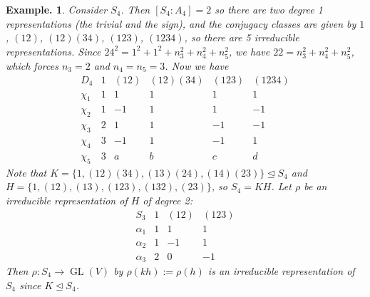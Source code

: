 \documentclass[11pt, a4paper]{memoir}
\theoremstyle{change}
\theoremstyle{plain}
\theoremstyle{nonumberplain}
\newtheorem{example}{Example.}
\DeclareMathOperator{\GL}{GL}
\numberwithin{equation}{section}
\begin{document}
\begin{example}
    Consider $S_4$.
    Then $[S_4:A_4]=2$ so there are two degree 1 representations (the trivial and the sign), and the conjugacy classes are given by $1$, $(12)$, $(12)(34)$, $(123)$, $(1234)$, so there are 5 irreducible representations.
    Since $24^2=1^2+1^2+n_3^2+n_4^2+n_5^2$, we have $22=n_3^2+n_4^2+n_5^2$, which forces $n_3=2$ and $n_4=n_5=3$.
    Now we have
    \begin{equation*}
        \begin{array}{c|ccccc}
            D_4    & 1 & (12) &(12)(34)& (123) & (1234)\\
            \hline
            \chi_1 & 1 & 1 & 1 & 1 & 1\\
            \hline
            \chi_2 & 1 &-1 & 1 & 1 &-1\\
            \hline
            \chi_3 & 2 & 1 & 1 &-1 &-1\\
            \hline
            \chi_4 & 3 &-1 & 1 &-1 & 1\\
            \hline
            \chi_5 & 3 & a & b & c & d
        \end{array}
    \end{equation*}
    Note that $K=\{1,(12)(34),(13)(24),(14)(23)\}\trianglelefteq S_4$ and $H=\{1,(12),(13),(123),(132),(23)\}$, so $S_4=KH$.
    Let $\rho$ be an irreducible representation of $H$ of degree 2:
    \begin{equation*}
        \begin{array}{c|cccc}
            S_3 & 1 & (12) & (123)\\
            \hline
            \alpha_1 & 1 & 1 & 1\\
            \alpha_2 & 1 &-1 & 1\\
            \alpha_3 & 2 & 0 & -1
        \end{array}
    \end{equation*}
    Then $\rho:S_4\to\GL(V)$ by $\rho(kh):=\rho(h)$ is an irreducible representation of $S_4$ since $K\trianglelefteq S_4$.
\end{example}
\end{document}
